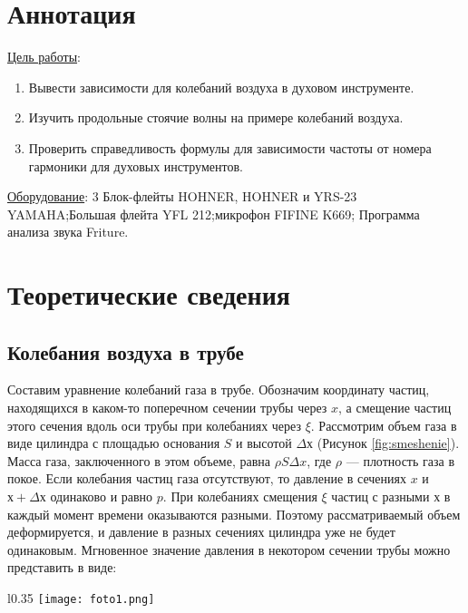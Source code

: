 \section{Аннотация}
\underline{Цель работы}: 
\begin{enumerate}
    \item Вывести зависимости для колебаний воздуха в духовом инструменте.
    \item Изучить продольные стоячие волны на примере колебаний воздуха.
    \item Проверить справедливость формулы для зависимости частоты от номера гармоники для духовых инструментов.
\end{enumerate} \par
\underline{Оборудование}: 3 Блок-флейты HOHNER, HOHNER и YRS-23 YAMAHA;Большая флейта YFL 212;микрофон FIFINE K669; Программа анализа звука Friture.
\newpage

\section{Теоретические сведения}
\subsection{Колебания воздуха в трубе}
Составим уравнение колебаний газа в трубе. Обозначим координату частиц, находящихся в каком-то поперечном сечении трубы через $x$, а смещение частиц этого сечения вдоль оси трубы при колебаниях через $\xi$. Рассмотрим объем газа в виде цилиндра с площадью основания $S$ и высотой $\Delta х$ (Рисунок \ref{fig:smeshenie}). Масса газа, заключенного в этом объеме, равна $\rho S \Delta x$, где $\rho$ --- плотность газа в покое. Если колебания частиц газа отсутствуют, то давление в сечениях $x$ и $х + \Delta х$ одинаково и равно $p$. При колебаниях смещения $\xi$ частиц с разными $х$ в каждый момент времени оказываются разными. Поэтому рассматриваемый объем деформируется, и давление в разных сечениях цилиндра уже не будет одинаковым. 
Мгновенное значение давления в некотором сечении трубы можно представить в виде:

\begin{wrapfigure}{l}{0.35\textwidth} 
    \texttt{[image: foto1.png]}
    \caption{Смещение газа в трубе}
    \label{fig:smeshenie}
\end{wrapfigure}

